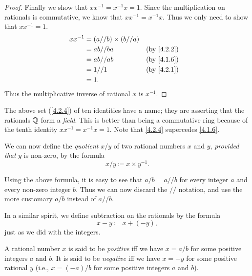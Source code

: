 \begin{proof}
  Finally we show that \(xx^{-1} = x^{-1}x = 1\).
  Since the multiplication on rationals is commutative, we know that \(xx^{-1} = x^{-1}x\).
  Thus we only need to show that \(xx^{-1} = 1\).
  \begin{align*}
    xx^{-1} & = (a // b) \times (b // a)                               \\
            & = ab // ba                 &  & \text{(by \cref{4.2.2})} \\
            & = ab // ab                 &  & \text{(by \cref{4.1.6})} \\
            & = 1 // 1                   &  & \text{(by \cref{4.2.1})} \\
            & = 1.
  \end{align*}
  Thus the multiplicative inverse of rational \(x\) is \(x^{-1}\).
\end{proof}

\begin{rmk}\label{4.2.5}
  The above set (\cref{4.2.4}) of ten identities have a name;
  they are asserting that the rationals \(\mathbb{Q}\) form a \emph{field}.
  This is better than being a commutative ring because of the tenth identity \(xx^{-1} = x^{-1}x = 1\).
  Note that \cref{4.2.4} supercedes \cref{4.1.6}.
\end{rmk}

\begin{note}
  We can now define the \emph{quotient} \(x / y\) of two rational numbers \(x\) and \(y\), \emph{provided that} \(y\) is non-zero, by the formula
  \[
    x / y \coloneqq x \times y^{-1}.
  \]
\end{note}

\begin{note}
  Using the above formula, it is easy to see that \(a / b = a // b\) for every integer \(a\) and every non-zero integer \(b\).
  Thus we can now discard the \(//\) notation, and use the more customary \(a / b\) instead of \(a // b\).
\end{note}

\begin{note}
  In a similar spirit, we define subtraction on the rationals by the formula
  \[
    x - y \coloneqq x + (-y),
  \]
  just as we did with the integers.
\end{note}

\begin{defn}\label{4.2.6}
  A rational number \(x\) is said to be \emph{positive} iff we have \(x = a / b\) for some positive integers \(a\) and \(b\).
  It is said to be \emph{negative} iff we have \(x = -y\) for some positive rational \(y\)
  (i.e., \(x = (-a) / b\) for some positive integers \(a\) and \(b\)).
\end{defn}

